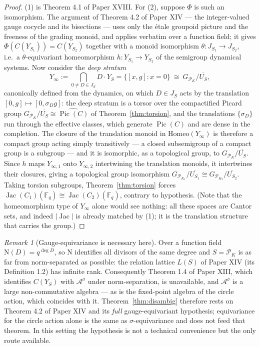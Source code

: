 \documentclass[11pt]{amsart}
\numberwithin{equation}{section}
\theoremstyle{definition}
\theoremstyle{remark}
\newtheorem{remark}[theorem]{Remark}
\newcommand{\F}{\mathbb{F}}
\newcommand{\cA}{\mathcal{A}}
\newcommand{\cP}{\mathcal{P}}
\newcommand{\Ns}{\mathrm{N}}
\newcommand{\Pic}{\operatorname{Pic}}
\newcommand{\Jac}{\operatorname{Jac}}
\begin{document}
\begin{proof}
(1) is Theorem 4.1 of Paper XVIII. For (2), suppose $\Phi$ is such an isomorphism. The
argument of Theorem 4.2 of Paper XIV --- the integer-valued gauge cocycle and its bisections
--- uses only the \'etale groupoid picture and the freeness of the grading monoid, and
applies verbatim over a function field; it gives $\Phi(C(Y_{S_1}))=C(Y_{S_2})$ together
with a monoid isomorphism $\theta:J_{S_1}\to J_{S_2}$, i.e.\ a $\theta$-equivariant
homeomorphism $h:Y_{S_1}\to Y_{S_2}$ of the semigroup dynamical systems. Now consider the
\emph{deep stratum}
\[
Y_\infty:=\bigcap_{0\ne D\in J_S}D\cdot Y_S=\{[x,g]:x=0\}\ \cong\ G_{\cP_K}\big/\overline{U_S},
\]
canonically defined from the dynamics, on which $D\in J_S$ acts by the translation
$[0,g]\mapsto[0,\sigma_Dg]$: the deep stratum is a torsor over the compactified Picard group
$G_{\cP_K}/\overline{U_S}\cong\widehat{\Pic(C)}$ of Theorem~\ref{thm:torsion}, and the
translations $\{\sigma_D\}$ run through the effective classes, which generate $\Pic(C)$ and
are dense in the completion. The closure of the translation monoid in
$\mathrm{Homeo}(Y_\infty)$ is therefore a compact group acting simply transitively --- a
closed subsemigroup of a compact group is a subgroup --- and it is isomorphic, as a
topological group, to $G_{\cP_K}/\overline{U_S}$. Since $h$ maps $Y_{\infty,1}$ onto
$Y_{\infty,2}$ intertwining the translation monoids, it intertwines their closures, giving
a topological group isomorphism
$G_{\cP_{K_1}}/\overline{U_{S_1}}\cong G_{\cP_{K_2}}/\overline{U_{S_2}}$. Taking torsion
subgroups, Theorem~\ref{thm:torsion} forces $\Jac(C_1)(\F_q)\cong\Jac(C_2)(\F_q)$, contrary
to hypothesis. (Note that the homeomorphism type of $Y_\infty$ alone would see nothing: all
these spaces are Cantor sets, and indeed $|\Jac|$ is already matched by (1); it is the
translation structure that carries the group.)
\end{proof}

\begin{remark}[Gauge-equivariance is necessary here]\label{rem:necessary}
Over a function field $\Ns(D)=q^{\deg D}$, so $\Ns$ identifies all divisors of the same
degree and $S=\cP_K$ is as far from norm-separated as possible: the relation lattice
$L(S)$ of Paper XIV (its Definition 1.2) has infinite rank. Consequently
Theorem 1.4 of Paper XIII, which identifies $C(Y_S)$ with $\cA^\sigma$ under
norm-separation, is unavailable, and
$\cA^\sigma$ is a large non-commutative algebra --- as is the fixed-point algebra of the
circle action, which coincides with it. Theorem~\ref{thm:disambig} therefore rests on
Theorem 4.2 of Paper XIV and its \emph{full} gauge-equivariant hypothesis; equivariance for
the circle action alone is the same as $\sigma$-equivariance and does not feed that theorem.
In this setting the hypothesis is not a
technical convenience but the only route available.
\end{remark}
\end{document}
